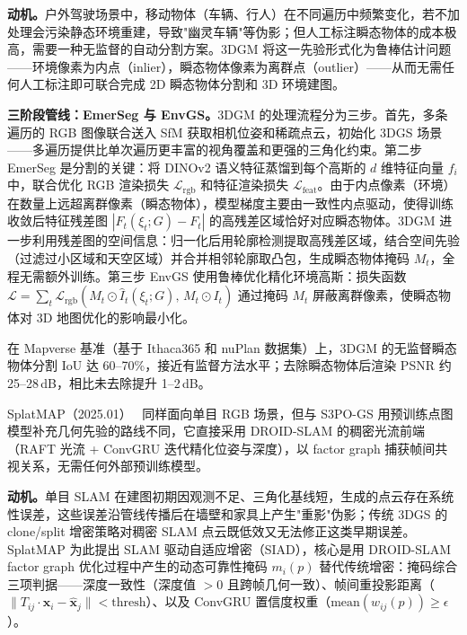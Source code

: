 \textbf{动机。}户外驾驶场景中，移动物体（车辆、行人）在不同遍历中频繁变化，若不加处理会污染静态环境重建，导致"幽灵车辆"等伪影；但人工标注瞬态物体的成本极高，需要一种无监督的自动分割方案。3DGM 将这一先验形式化为鲁棒估计问题——环境像素为内点（inlier），瞬态物体像素为离群点（outlier）——从而无需任何人工标注即可联合完成 2D 瞬态物体分割和 3D 环境建图。

\textbf{三阶段管线：EmerSeg 与 EnvGS。}3DGM 的处理流程分为三步。首先，多条遍历的 RGB 图像联合送入 SfM 获取相机位姿和稀疏点云，初始化 3DGS 场景——多遍历提供比单次遍历更丰富的视角覆盖和更强的三角化约束。第二步 EmerSeg 是分割的关键：将 DINOv2 语义特征蒸馏到每个高斯的 $d$ 维特征向量 $f_i$ 中，联合优化 RGB 渲染损失 $\mathcal{L}_{\mathrm{rgb}}$ 和特征渲染损失 $\mathcal{L}_{\mathrm{feat}}$。由于内点像素（环境）在数量上远超离群像素（瞬态物体），模型梯度主要由一致性内点驱动，使得训练收敛后特征残差图 $|F_t(\xi_t; G) - F_t|$ 的高残差区域恰好对应瞬态物体。3DGM 进一步利用残差图的空间信息：归一化后用轮廓检测提取高残差区域，结合空间先验（过滤过小区域和天空区域）并合并相邻轮廓取凸包，生成瞬态物体掩码 $M_t$，全程无需额外训练。第三步 EnvGS 使用鲁棒优化精化环境高斯：损失函数 $\mathcal{L} = \sum_t \mathcal{L}_{\mathrm{rgb}}(M_t \odot \hat{I}_t(\xi_t; G),\, M_t \odot I_t)$ 通过掩码 $M_t$ 屏蔽离群像素，使瞬态物体对 3D 地图优化的影响最小化。

在 Mapverse 基准（基于 Ithaca365 和 nuPlan 数据集）上，3DGM 的无监督瞬态物体分割 IoU 达 60--70\%，接近有监督方法水平；去除瞬态物体后渲染 PSNR 约 25--28\,dB，相比未去除提升 1--2\,dB。

SplatMAP（2025.01）~\cite{2501_07015} 同样面向单目 RGB 场景，但与 S3PO-GS 用预训练点图模型补充几何先验的路线不同，它直接采用 DROID-SLAM 的稠密光流前端（RAFT 光流 + ConvGRU 迭代精化位姿与深度），以 factor graph 捕获帧间共视关系，无需任何外部预训练模型。

\textbf{动机。}单目 SLAM 在建图初期因观测不足、三角化基线短，生成的点云存在系统性误差，这些误差沿管线传播后在墙壁和家具上产生"重影"伪影；传统 3DGS 的 clone/split 增密策略对稠密 SLAM 点云既低效又无法修正这类早期误差。SplatMAP 为此提出 SLAM 驱动自适应增密（SIAD），核心是用 DROID-SLAM factor graph 优化过程中产生的动态可靠性掩码 $m_i(p)$ 替代传统增密：掩码综合三项判据——深度一致性（深度值 $>0$ 且跨帧几何一致）、帧间重投影距离（$\|T_{ij}\cdot\mathbf{x}_i - \hat{\mathbf{x}}_j\| < \mathrm{thresh}$）、以及 ConvGRU 置信度权重（$\mathrm{mean}(w_{ij}(p)) \geq \epsilon$）。

